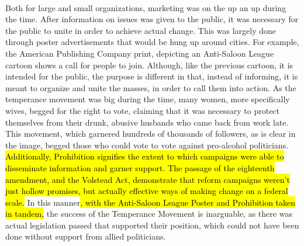 \documentclass[12pt]{article}
\begin{document}
\paragraph{} Both for large and small organizations, marketing was on the up an up during the time. After information on issues was given to the public, it was necessary for the public to unite in order to achieve actual change. This was largely done through poster advertisements that would be hung up around cities. For example, the American Publishing Company print, depicting an Anti-Saloon League cartoon shows a call for people to join. Although, like the previous cartoon, it is intended for the public, the purpose is different in that, instead of informing, it is meant to organize and unite the masses, in order to call them into action. As the temperance movement was big during the time, many women, more specifically wives, begged for the right to vote, claiming that it was necessary to protect themselves from their drunk, abusive husbands who came back from work late. This movement, which garnered hundreds of thousands of followers, as is clear in the image, begged those who could vote to vote against pro-alcohol politicians. \hl{Additionally, Prohibition signifies the extent to which campaigns were able to disseminate information and garner support. The passage of the eighteenth amendment, and the Volstead Act, demonstrate that reform campaigns weren't just hollow promises, but actually effective ways of making change on a federal scale.} In this manner\hl{, with the Anti-Saloon League Poster and Prohibition taken in tandem,} the success of the Temperance Movement is inarguable, as there was actual legislation passed that supported their position, which could not have been done without support from allied politicians.
\end{document}
